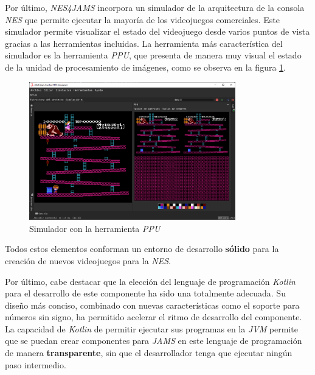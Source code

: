 Por último, \textit{NES4JAMS} incorpora un simulador de la arquitectura
de la consola \textit{NES} que permite ejecutar la mayoría de los
videojuegos comerciales.
Este simulador permite visualizar el estado del videojuego desde varios
puntos de vista gracias a las herramientas incluidas.
La herramienta más característica del simulador es la herramienta
\textit{PPU}, que presenta de manera muy visual el estado
de la unidad de procesamiento de imágenes,
como se observa en la figura \ref{fig:nes-result-simulator}.

\begin{figure}[h]
    \centering
    \includegraphics[width=0.8\textwidth]{images/results/nes-simulator}
    \caption{Simulador con la herramienta \textit{PPU}}
    \label{fig:nes-result-simulator}
\end{figure}

Todos estos elementos conforman un entorno de desarrollo
\textbf{sólido} para la creación de nuevos videojuegos
para la \textit{NES}.

Por último, cabe destacar que la elección del lenguaje
de programación \textit{Kotlin} para el desarrollo de
este componente ha sido una totalmente adecuada.
Su diseño más conciso, combinado con nuevas características
como el soporte para números sin signo, ha permitido
acelerar el ritmo de desarrollo del componente.
La capacidad de \textit{Kotlin} de permitir ejecutar sus
programas en la \textit{JVM} permite que se puedan
crear componentes para \textit{JAMS} en este lenguaje
de programación de manera \textbf{transparente}, sin
que el desarrollador tenga que ejecutar ningún paso intermedio.
